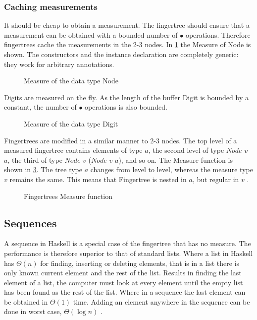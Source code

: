 \subsubsection{Caching measurements}
It should be cheap to obtain a measurement. The fingertree should ensure that a
measurement can be obtained with a bounded number of $\bullet$ operations.
Therefore fingertrees cache the measurements in the 2-3 nodes. In
\cref{fig:measureNode} the Measure of Node is shown.
The constructors and the instance declaration are completely generic: they
work for arbitrary annotations.

\begin{figure}[h!]

\caption{Measure of the data type Node \label{fig:measureNode}}
\end{figure}

Digits are measured on the fly. As the length of the buffer Digit is bounded by
a constant, the number of $\bullet$ operations is also bounded.

\begin{figure}[h!]

\caption{Measure of the data type Digit \label{fig:measureDigit}}
\end{figure}

Fingertrees are modified in a similar manner to 2-3 nodes.
The top level of a measured fingertree contains elements of type $a$, the second
level of type $Node$ $v$ $a$, the third of type $Node$ $v$ ($Node$ $v$ $a$), and
so on. The Measure function is shown in \cref{fig:measureFingerTree}. The tree 
type $a$ changes from level to level, whereas the measure type $v$ remains the 
same. This means that Fingertree is nested in $a$, but regular in $v$ \cite{fingertree}.

\begin{figure}[h!]

\caption{Fingertrees Measure function \label{fig:measureFingerTree}}
\end{figure}


\subsection{Sequences}
A sequence in Haskell is a special case of the fingertree that has no measure.
The performance is therefore superior to that of standard lists. Where a list in
Haskell has $\Theta(n)$ for finding, inserting or deleting elements, that is in
a list there is only known current element and the rest of the list. Results in 
finding the last element of a list, the computer must look at every element
until the empty list has been found as the rest of the list. Where in a sequence
the last element can be obtained in $\Theta(1)$ time. Adding an element anywhere
in the sequence can be done in worst case, $\Theta(\log n)$ \cite{fingertree}.

